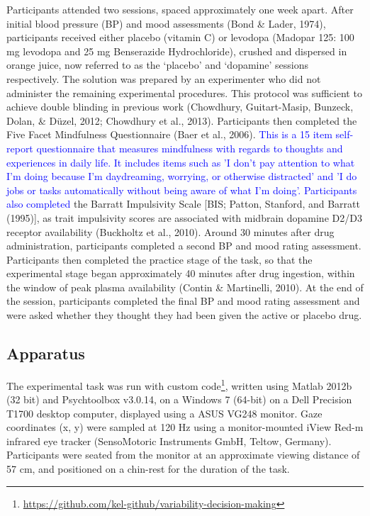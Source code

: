 \documentclass[
  man]{apa6}
\begin{document}
Participants attended two sessions, spaced approximately one week apart. After initial blood pressure (BP) and mood assessments (Bond \& Lader, 1974), participants received either placebo (vitamin C) or levodopa (Madopar 125: 100 mg levodopa and 25 mg Benserazide Hydrochloride), crushed and dispersed in orange juice, now referred to as the `placebo' and `dopamine' sessions respectively. The solution was prepared by an experimenter who did not administer the remaining experimental procedures. This protocol was sufficient to achieve double blinding in previous work (Chowdhury, Guitart-Masip, Bunzeck, Dolan, \& Düzel, 2012; Chowdhury et al., 2013). Participants then completed the Five Facet Mindfulness Questionnaire (Baer et al., 2006). \textcolor{blue}{This is a 15 item self-report questionnaire that measures mindfulness with regards to thoughts and experiences in daily life. It includes items such as 'I don't pay attention to what I'm doing because I'm daydreaming, worrying, or otherwise distracted' and 'I do jobs or tasks automatically without being aware of what I'm doing'. Participants also completed} the Barratt Impulsivity Scale {[}BIS; Patton, Stanford, and Barratt (1995){]}, as trait impulsivity scores are associated with midbrain dopamine D2/D3 receptor availability (Buckholtz et al., 2010). Around 30 minutes after drug administration, participants completed a second BP and mood rating assessment. Participants then completed the practice stage of the task, so that the experimental stage began approximately 40 minutes after drug ingestion, within the window of peak plasma availability (Contin \& Martinelli, 2010). At the end of the session, participants completed the final BP and mood rating assessment and were asked whether they thought they had been given the active or placebo drug.

\hypertarget{apparatus}{%
\subsection{Apparatus}\label{apparatus}}

\label{sec:Apparatus}

The experimental task was run with custom code\footnote{\url{https://github.com/kel-github/variability-decision-making}}, written using Matlab 2012b (32 bit) and Psychtoolbox v3.0.14, on a Windows 7 (64-bit) on a Dell Precision T1700 desktop computer, displayed using a ASUS VG248 monitor. Gaze coordinates (x, y) were sampled at 120 Hz using a monitor-mounted iView Red-m infrared eye tracker (SensoMotoric Instruments GmbH, Teltow, Germany). Participants were seated from the monitor at an approximate viewing distance of 57 cm, and positioned on a chin-rest for the duration of the task.
\end{document}
